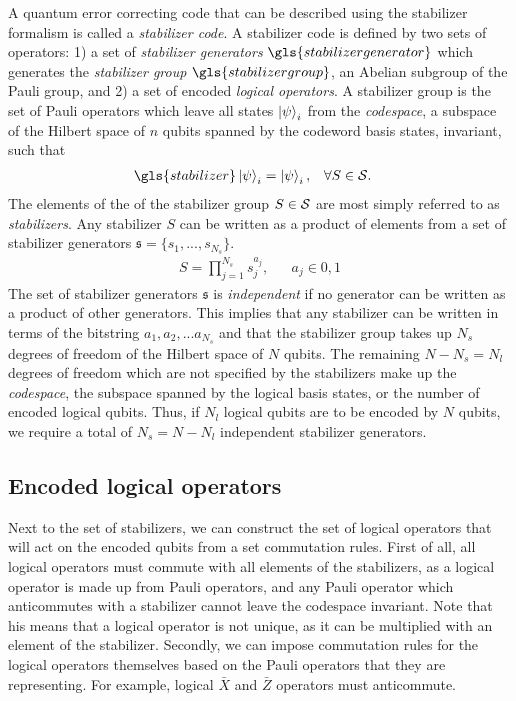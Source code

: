 A quantum error correcting code that can be described using the stabilizer formalism is called a \emph{stabilizer code}. A stabilizer code is defined by two sets of operators: 1) a set of \emph{stabilizer generators} $\gls{stabilizergenerator}$ which generates the \emph{stabilizer group} $\gls{stabilizergroup}$, an Abelian subgroup of the Pauli group, and 2) a set of encoded \emph{logical operators}. A stabilizer group is the set of Pauli operators which leave all states $\ket{\psi}_i$ from the \emph{codespace}, a subspace of the Hilbert space of $n$ qubits spanned by the codeword basis states, invariant, such that
\begin{align}
  & \gls{stabilizer}\ket{\psi}_i = \ket{\psi}_i, && \forall S \in \m{S}. &
\end{align}
The elements of the of the stabilizer group $S\in\mathcal{S}$ are most simply referred to as \emph{stabilizers}. Any stabilizer $S$ can be written as a product of elements from a set of stabilizer generators $\mathfrak{s}=\{s_1,...,s_{N_s}\}$.  
\begin{align}
 & S = \prod_{j=1}^{N_s}s_j^{a_j}, && a_j \in {0, 1} &
\end{align}
The set of stabilizer generators $\mathfrak{s}$ is \emph{independent} if no generator can be written as a product of other generators. This implies that any stabilizer can be written in terms of the bitstring $a_1, a_2, ...a_{N_s}$ and that the stabilizer group takes up $N_s$ degrees of freedom of the Hilbert space of $N$ qubits. The remaining $N-N_s = N_l$ degrees of freedom which are not specified by the stabilizers make up the \emph{codespace}, the subspace spanned by the logical basis states, or the number of encoded logical qubits. Thus, if $N_l$ logical qubits are to be encoded by $N$ qubits, we require a total of $N_s = N-N_l$ independent stabilizer generators.


\subsection{Encoded logical operators}

Next to the set of stabilizers, we can construct the set of logical operators that will act on the encoded qubits from a set commutation rules. First of all, all logical operators must commute with all elements of the stabilizers, as a logical operator is made up from Pauli operators, and any Pauli operator which anticommutes with a stabilizer cannot leave the codespace invariant. Note that his means that a logical operator is not unique, as it can be multiplied with an element of the stabilizer. Secondly, we can impose commutation rules for the logical operators themselves based on the Pauli operators that they are representing. For example, logical $\bar{X}$ and $\bar{Z}$ operators must anticommute.

